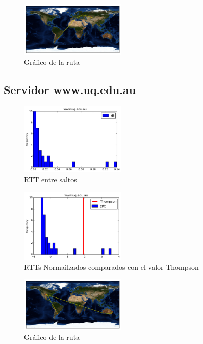 \begin{figure}[H]
  \centering
    \includegraphics[width=0.45\textwidth]{grafico-rutas/www-kstu-kz.png}
  \caption{Gráfico de la ruta}
  \label{entropia-s}
\end{figure}




\subsection{Servidor www.uq.edu.au}
\begin{figure}[H]
  \centering
    \includegraphics[width=0.45\textwidth]{histogramas_rtt/www-uq-edu-au.png}
  \caption{RTT entre saltos}
  \label{entropia-s}
\end{figure}

\begin{figure}[H]
  \centering
    \includegraphics[width=0.45\textwidth]{histogramas_thompson/www-uq-edu-au.png}
  \caption{RTTs Normailzados comparados con el valor Thompson}
  \label{entropia-s}
\end{figure}

\begin{figure}[H]
  \centering
    \includegraphics[width=0.45\textwidth]{grafico-rutas/www-uq-edu-au.png}
  \caption{Gráfico de la ruta}
  \label{entropia-s}
\end{figure}





